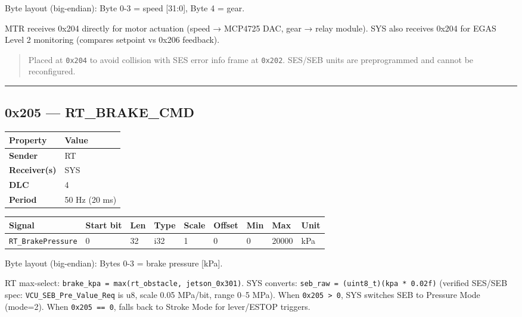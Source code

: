 \documentclass[12pt,a4paper,oneside]{report}
\begin{document}
Byte layout (big-endian): Byte 0-3 = speed {[}31:0{]}, Byte 4 = gear.

MTR receives 0x204 directly for motor actuation (speed → MCP4725 DAC, gear →
relay module). SYS also receives 0x204 for EGAS Level 2 monitoring (compares
setpoint vs 0x206 feedback).

\begin{quote}
Placed at \texttt{0x204} to avoid collision with SES error info frame at
\texttt{0x202}. SES/SEB units are preprogrammed and cannot be reconfigured.
\end{quote}

\begin{center}\rule{0.5\linewidth}{0.5pt}\end{center}

\subsection{0x205 --- RT\_BRAKE\_CMD}\label{x205-rt_brake_cmd}

\begin{longtable}[]{@{}ll@{}}
\toprule\noalign{}
Property & Value \\
\midrule\noalign{}
\endhead
\bottomrule\noalign{}
\endlastfoot
\textbf{Sender} & RT \\
\textbf{Receiver(s)} & SYS \\
\textbf{DLC} & 4 \\
\textbf{Period} & 50 Hz (20 ms) \\
\end{longtable}

\begin{longtable}[]{@{}lllllllll@{}}
\toprule\noalign{}
Signal & Start bit & Len & Type & Scale & Offset & Min & Max & Unit \\
\midrule\noalign{}
\endhead
\bottomrule\noalign{}
\endlastfoot
\texttt{RT\_BrakePressure} & 0 & 32 & i32 & 1 & 0 & 0 & 20000 & kPa \\
\end{longtable}

Byte layout (big-endian): Bytes 0-3 = brake pressure {[}kPa{]}.

RT max-select: \texttt{brake\_kpa\ =\ max(rt\_obstacle,\ jetson\_0x301)}. SYS
converts: \texttt{seb\_raw\ =\ (uint8\_t)(kpa\ *\ 0.02f)} (verified SES/SEB
spec: \texttt{VCU\_SEB\_Pre\_Value\_Req} is u8, scale 0.05 MPa/bit, range 0--5
MPa). When \texttt{0x205\ \textgreater{}\ 0}, SYS switches SEB to Pressure Mode
(mode=2). When \texttt{0x205\ ==\ 0}, falls back to Stroke Mode for lever/ESTOP
triggers.
\end{document}
